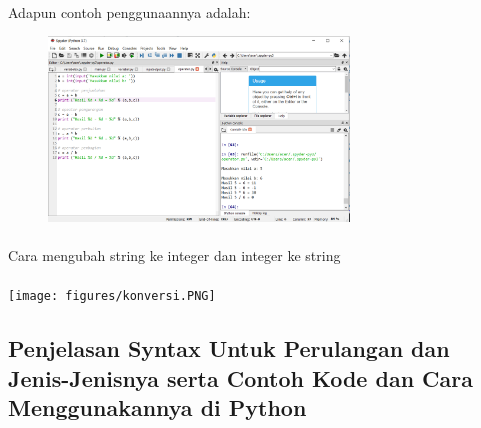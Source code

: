 \paragraph{} Adapun contoh penggunaannya adalah: 
\begin{figure}[h]
                 \centerline{\includegraphics[width=8cm]{figures/operator2.PNG}}
        \end{figure}
\paragraph{} Cara mengubah string ke integer dan integer ke string
\paragraph{}
    \centerline{\texttt{[image: figures/konversi.PNG]}}
    
\subsection{Penjelasan Syntax Untuk Perulangan dan Jenis-Jenisnya serta Contoh Kode dan Cara Menggunakannya di Python}
